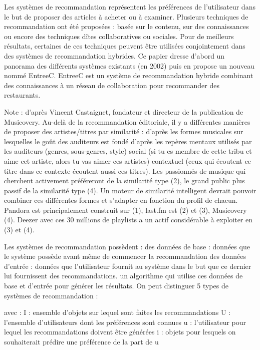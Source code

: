 Les systèmes de recommandation représentent les préférences de l'utilisateur dans le but de proposer des articles à acheter ou à examiner. Plusieurs techniques de recommandation ont été proposées : basée sur le contenu, sur des connaissances ou encore des techniques dîtes collaboratives ou sociales. Pour de meilleurs résultats, certaines de ces techniques peuvent être utilisées conjointement dans des systèmes de recommandation hybrides. Ce papier dresse d’abord un panorama des différents systèmes existants (en 2002) puis en propose un nouveau nommé EntreeC. EntreeC est un système de recommandation hybride combinant des connaissances à un réseau de collaboration pour recommander des restaurants.

Note : d’après Vincent Castaignet, fondateur et directeur de la publication de Musicovery.
Au-delà de la recommandation éditoriale, il y a différentes manières de proposer des artistes/titres par similarité : 
d’après les formes musicales sur lesquelles le goût des auditeurs est fondé
d’après les repères mentaux utilisés par les auditeurs (genres, sous-genres, style)
social (si tu es membre de cette tribu et aime cet artiste, alors tu vas aimer ces artistes)
contextuel (ceux qui écoutent ce titre dans ce contexte écoutent aussi ces titres).
Les passionnés de musique qui cherchent activement préféreront de la similarité type (2), le grand public plus passif de la similarité type (4). Un moteur de similarité intelligent devrait pouvoir combiner ces différentes formes et s’adapter en fonction du profil de chacun.
Pandora est principalement construit sur (1), last.fm est (2) et (3), Musicovery (4). Deezer avec ces 30 millions de playlists a un actif considérable à exploiter en (3) et (4).

Les systèmes de recommandation possèdent :
des données de base : données que le système possède avant même de commencer la recommandation
des données d’entrée : données que l’utilisateur fournit au système dans le but que ce dernier lui fournissent des recommandations.
un algorithme qui utilise ces données de base et d’entrée pour générer les résultats.
On peut distinguer 5 types de systèmes de recommandation :
    
avec : 
I : ensemble d’objets sur lequel sont faites les recommandations
U : l’ensemble d’utilisateurs dont les préférences sont connues
u : l’utilisateur pour lequel les recommandations doivent être générées
i : objets pour lesquels on souhaiterait prédire une préférence de la part de u

